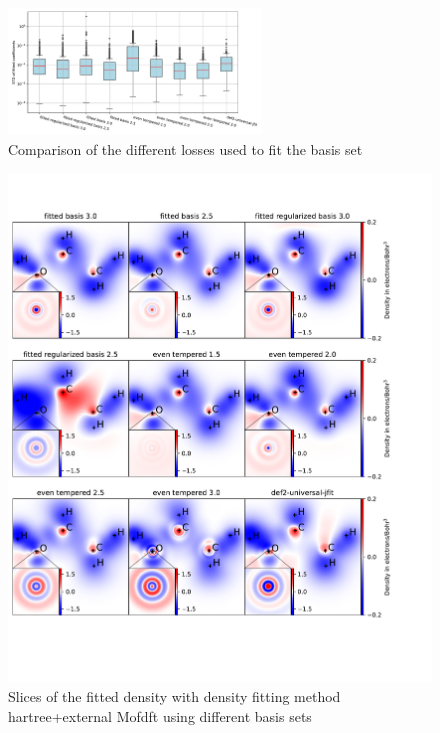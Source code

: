 \begin{figure}
    \includegraphics[width=0.6\textwidth]{chapters/results/results_images/var_basis_sets}
    \caption{Comparison of the different losses used to fit the basis set}
\end{figure}


 \begin{figure}
   \centering
   \includegraphics[width=1\textwidth]{chapters/results/results_images/basis_set_slices}
     \caption{Slices of the fitted density with density fitting method hartree+external Mofdft using different basis sets}
 \end{figure}

